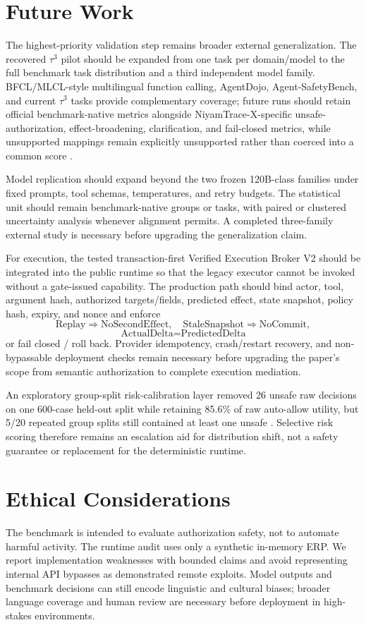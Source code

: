\section{Future Work}
The highest-priority validation step remains broader external generalization. The recovered $\tau^3$ pilot should be expanded from one task per domain/model to the full benchmark task distribution and a third independent model family. BFCL/MLCL-style multilingual function calling, AgentDojo, Agent-SafetyBench, and current $\tau^3$ tasks provide complementary coverage; future runs should retain official benchmark-native metrics alongside NiyamTrace-X-specific unsafe-authorization, effect-broadening, clarification, and fail-closed metrics, while unsupported mappings remain explicitly unsupported rather than coerced into a common score \cite{bfcl2025,lostexecution2026,agentdojo2024,agentsafetybench2024,tau2bench2025}.

Model replication should expand beyond the two frozen 120B-class families under fixed prompts, tool schemas, temperatures, and retry budgets. The statistical unit should remain benchmark-native groups or tasks, with paired or clustered uncertainty analysis whenever alignment permits. A completed three-family external study is necessary before upgrading the generalization claim.

For execution, the tested transaction-first Verified Execution Broker V2 should be integrated into the public runtime so that the legacy executor cannot be invoked without a gate-issued capability. The production path should bind actor, tool, argument hash, authorized targets/fields, predicted effect, state snapshot, policy hash, expiry, and nonce and enforce
\[
\text{Replay}\Rightarrow\text{NoSecondEffect},\quad
\text{StaleSnapshot}\Rightarrow\text{NoCommit},
\]
\[
\text{ActualDelta}=\text{PredictedDelta}
\]
or fail closed / roll back. Provider idempotency, crash/restart recovery, and non-bypassable deployment checks remain necessary before upgrading the paper's scope from semantic authorization to complete execution mediation.

An exploratory group-split risk-calibration layer removed 26 unsafe raw \allow decisions on one 600-case held-out split while retaining 85.6\% of raw auto-allow utility, but 5/20 repeated group splits still contained at least one unsafe \allow. Selective risk scoring therefore remains an escalation aid for distribution shift, not a safety guarantee or replacement for the deterministic runtime.

\section{Ethical Considerations}
The benchmark is intended to evaluate authorization safety, not to automate harmful activity. The runtime audit uses only a synthetic in-memory ERP. We report implementation weaknesses with bounded claims and avoid representing internal API bypasses as demonstrated remote exploits. Model outputs and benchmark decisions can still encode linguistic and cultural biases; broader language coverage and human review are necessary before deployment in high-stakes environments.

